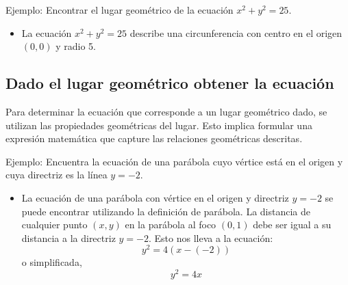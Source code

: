 Ejemplo: Encontrar el lugar geométrico de la ecuación $x^2 + y^2 = 25$.
\begin{itemize}
    \item La ecuación $x^2 + y^2 = 25$ describe una circunferencia con centro en el origen $(0, 0)$ y radio 5.
\end{itemize}

\begin{center}
\end{center}

\subsection{Dado el lugar geométrico obtener la ecuación}
Para determinar la ecuación que corresponde a un lugar geométrico dado, se utilizan las propiedades geométricas del lugar. Esto implica formular una expresión matemática que capture las relaciones geométricas descritas.

Ejemplo: Encuentra la ecuación de una parábola cuyo vértice está en el origen y cuya directriz es la línea $y = -2$.
\begin{itemize}
    \item La ecuación de una parábola con vértice en el origen y directriz $y = -2$ se puede encontrar utilizando la definición de parábola. La distancia de cualquier punto $(x, y)$ en la parábola al foco $(0, 1)$ debe ser igual a su distancia a la directriz $y = -2$. Esto nos lleva a la ecuación:
    \[
    y^2 = 4(x - (-2))
    \]
    o simplificada,
    \[
    y^2 = 4x
    \]
\end{itemize}

